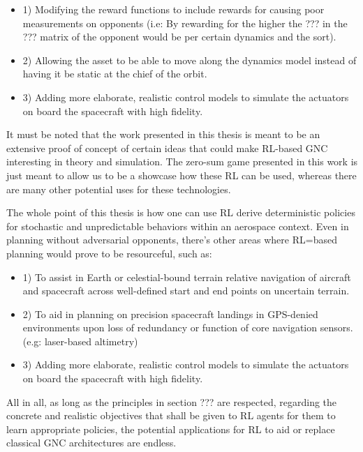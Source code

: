 \begin{itemize}

    \item 1) Modifying the reward functions to include rewards for causing poor measurements on opponents (i.e: By rewarding for the higher the ??? in the ??? matrix of the opponent would be per certain dynamics and the sort).

    \item 2) Allowing the asset to be able to move along the dynamics model instead of having it be static at the chief of the orbit.

    \item 3) Adding more elaborate, realistic control models to simulate the actuators on board the spacecraft with high fidelity.
\end{itemize}


It must be noted that the work presented in this thesis is meant to be an extensive proof of concept of certain ideas that could make RL-based GNC interesting in theory and simulation. The zero-sum game presented in this work is just meant to allow us to be a showcase how these RL can be used, whereas there are many other potential uses for these technologies.

The whole point of this thesis is how one can use RL derive deterministic policies for stochastic and unpredictable behaviors within an aerospace context. Even in planning without adversarial opponents, there's other areas where RL=based planning would prove to be resourceful, such as:

\begin{itemize}

    \item 1) To assist in Earth or celestial-bound terrain relative navigation of aircraft and spacecraft across well-defined start and end points on uncertain terrain.
    
    
    \item 2) To aid in planning on precision spacecraft landings in GPS-denied environments upon loss of redundancy or function of core navigation sensors. (e.g: laser-based altimetry)

    \item 3) Adding more elaborate, realistic control models to simulate the actuators on board the spacecraft with high fidelity.
\end{itemize}


All in all, as long as the principles in section ??? are respected, regarding the concrete and realistic objectives that shall be given to RL agents for them to learn appropriate policies, the potential applications for RL to aid or replace classical GNC architectures are endless.
